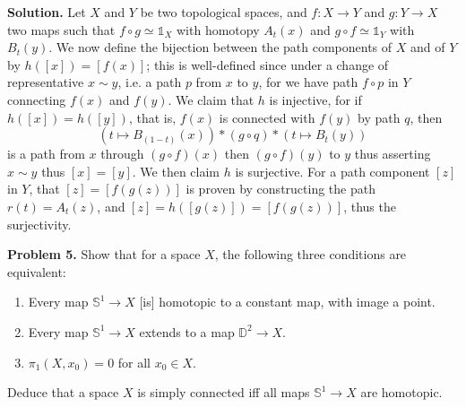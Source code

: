 \documentclass[10pt]{article}
\begin{document}
\begin{CJK*}{UTF8}{gbsn}
\textbf{Solution.} Let $X$ and $Y$ be two topological spaces, and $f:X\to Y$ and $g:Y\to X$ two maps such that $f\circ g\simeq\mathbb{1}_X$ with homotopy $A_t(x)$ and $g\circ f\simeq\mathbb{1}_Y$ with $B_t(y)$. We now define the bijection between the path components of $X$ and of $Y$ by $h([x])=[f(x)]$; this is well-defined since under a change of representative $x\sim y$, i.e. a path $p$ from $x$ to $y$, for we have path $f\circ p$ in $Y$ connecting $f(x)$ and $f(y)$. We claim that $h$ is injective, for if $h([x])=h([y])$, that is, $f(x)$ is connected with $f(y)$ by path $q$, then $$(t\mapsto B_{(1-t)}(x))*(g\circ q)*(t\mapsto B_t(y))$$ is a path from $x$ through $(g\circ f)(x)$ then $(g\circ f)(y)$ to $y$ thus asserting $x\sim y$ thus $[x]=[y]$. We then claim $h$ is surjective. For a path component $[z]$ in $Y$, that $[z]=[f(g(z))]$ is proven by constructing the path $r(t)=A_t(z)$, and $[z]=h([g(z)])=[f(g(z))]$, thus the surjectivity.

\textbf{Problem 5.} Show that for a space $X$, the following three conditions are equivalent:
\begin{enumerate}[label=(\alph*),nosep]
\item Every map $\mathbb{S}^1\to X$ [is] homotopic to a constant map, with image a point.
\item Every map $\mathbb{S}^1\to X$ extends to a map $\mathbb{D}^2\to X$.
\item $\pi_1(X,x_0)=0$ for all $x_0\in X$.
\end{enumerate}
Deduce that a space $X$ is simply connected iff all maps $\mathbb{S}^1\to X$ are homotopic.


\end{CJK*}
\end{document}
